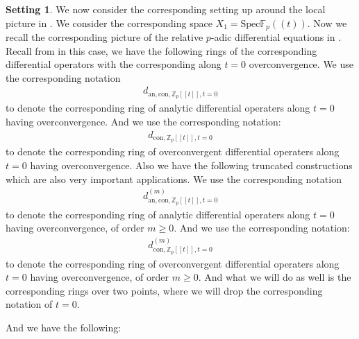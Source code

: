 \documentclass[11pt]{book}
\theoremstyle{definition}
\numberwithin{equation}{section}
\newtheorem{setting}[theorem]{Setting}
\begin{document}
\begin{setting}
\indent We now consider the corresponding setting up around the local picture in \cite{AM}. We consider the corresponding space $X_1=\mathrm{Spec}\mathbb{F}_p((t))$. Now we recall the corresponding picture of the relative $p$-adic differential equations in \cite{AM}. Recall from \cite[Section 2.1.2,2.1.3,2.1.4]{AM} in this case, we have the following rings of the corresponding differential operators with the corresponding along $t=0$ overconvergence. We use the corresponding notation
\begin{align}
d_{\mathrm{an},\mathrm{con},\mathbb{Z}_p[[t]],t=0}	
\end{align}
to denote the corresponding ring of analytic differential operaters along $t=0$ having overconvergence. And we use the corresponding notation:
\begin{align}
d_{\mathrm{con},\mathbb{Z}_p[[t]],t=0}	
\end{align}
to denote the corresponding ring of overconvergent differential operaters along $t=0$ having overconvergence. Also we have the following truncated constructions which are also very important applications. We use the corresponding notation
\begin{align}
d^{(m)}_{\mathrm{an},\mathrm{con},\mathbb{Z}_p[[t]],t=0}	
\end{align}
to denote the corresponding ring of analytic differential operaters along $t=0$ having overconvergence, of order $m\geq 0$. And we use the corresponding notation:
\begin{align}
d^{(m)}_{\mathrm{con},\mathbb{Z}_p[[t]],t=0}	
\end{align}
to denote the corresponding ring of overconvergent differential operaters along $t=0$ having overconvergence, of order $m\geq 0$. And what we will do as well is the corresponding rings over two points, where we will drop the corresponding notation of $t=0$.
\end{setting}


\indent And we have the following:
\end{document}
